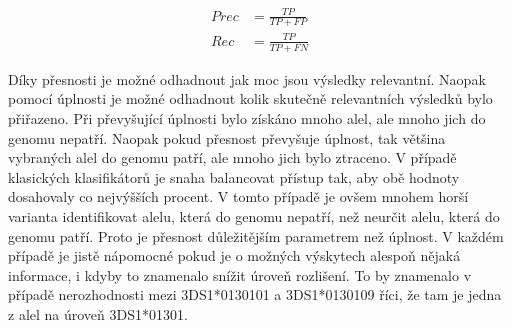 \documentclass[czech,DP]{thesiskiv}
\numberwithin{equation}{section}
\begin{document}
\begin{center}
	\begin{align}
   		\label{precision2} Prec &= \frac{TP}{TP + FP} \\[30pt]
   		\label{recall2} Rec &= \frac{TP}{TP + FN}
	\end{align}
\end{center}

\noindent
Díky přesnosti je možné odhadnout jak moc jsou výsledky relevantní. Naopak pomocí úplnosti je možné odhadnout kolik skutečně relevantních výsledků bylo přiřazeno. Při převyšující úplnosti bylo získáno mnoho alel, ale mnoho jich do genomu nepatří. Naopak pokud přesnost převyšuje úplnost, tak většina vybraných alel do genomu patří, ale mnoho jich bylo ztraceno. V případě klasických klasifikátorů je snaha balancovat přístup tak, aby obě hodnoty dosahovaly co nejvýšších procent. V tomto případě je ovšem mnohem horší varianta identifikovat alelu, která do genomu nepatří, než neurčit alelu, která do genomu patří. Proto je přesnost důležitějším parametrem než úplnost. V každém případě je jistě nápomocné pokud je o možných výskytech alespoň nějaká informace, i kdyby to znamenalo snížit úroveň rozlišení. To by znamenalo v případě nerozhodnosti mezi 3DS1*0130101 a 3DS1*0130109 říci, že tam je jedna z alel na úroveň 3DS1*01301. 
\end{document}

